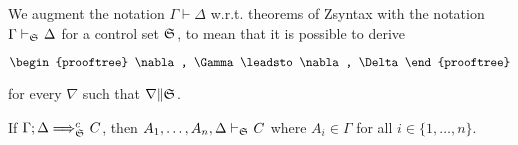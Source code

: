 \documentclass{docs}
\begin{document}
\begin{definition}
  We augment the notation $\Gamma \vdash \Delta$ w.r.t. theorems of Zsyntax with
  the notation $\Gamma \vdash_{\mathfrak{S}_{}} \Delta$ for a control set
  $\mathfrak{S}_{}$, to mean that it is possible to derive

  \[
    \begin{prooftree}
      \nabla, \Gamma
      \leadsto
      \nabla, \Delta
    \end{prooftree}
  \]

  for every $\nabla$ such that $\nabla \| \mathfrak{S}_{}$.
\end{definition}

\begin{theorem}[Soundness]
  If $\Gamma; \Delta \Longrightarrow^c_{\mathfrak{S}_{}} C$, then
  $A_1, \dots, A_n, \Delta \vdash_{\mathfrak{S}_{}} C$ where $A_i \in \Gamma$ for
  all $i \in \{ 1, \dots, n\}$.
\end{theorem}
\end{document}
